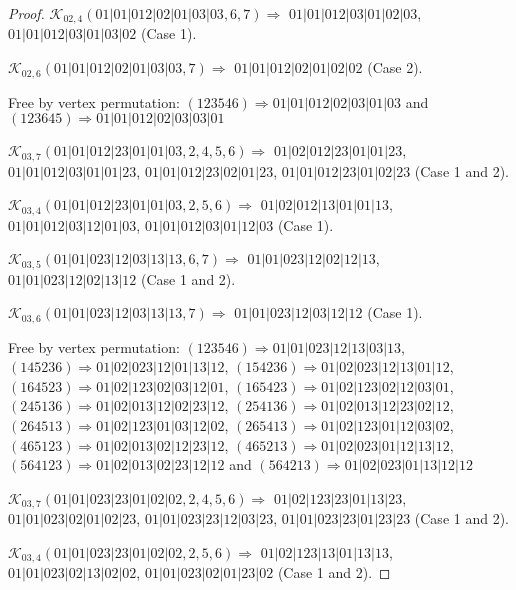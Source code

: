 \documentclass[12pt]{article}
\theoremstyle{plain}
\theoremstyle{definition}
\theoremstyle{remark}
\newcommand{\fancy}[1]{\mathcal{#1}}
\def\K{\fancy{K}}
\begin{document}
\begin{proof}
	$\K_{02,4}(01|01|012|02|01|03|03,6, 7)\Rightarrow $ $01|01|012|03|01|02|03$, $01|01|012|03|01|03|02$ (Case 1).
	
	$\K_{02,6}(01|01|012|02|01|03|03,7)\Rightarrow $ $01|01|012|02|01|02|02$ (Case 2).
	
	
	
	Free by vertex permutation: $(1 2 3 5 4 6)\Rightarrow 01|01|012|02|03|01|03$ and $(1 2 3 6 4 5)\Rightarrow 01|01|012|02|03|03|01$
	
	
	
	\bigskip
	
	$\K_{03,7}(01|01|012|23|01|01|03,2, 4, 5, 6)\Rightarrow $ $01|02|012|23|01|01|23$, $01|01|012|03|01|01|23$, $01|01|012|23|02|01|23$, $01|01|012|23|01|02|23$ (Case 1 and 2).
	
	$\K_{03,4}(01|01|012|23|01|01|03,2, 5, 6)\Rightarrow $ $01|02|012|13|01|01|13$, $01|01|012|03|12|01|03$, $01|01|012|03|01|12|03$ (Case 1).
	
	
	\bigskip
	
	$\K_{03,5}(01|01|023|12|03|13|13,6, 7)\Rightarrow $ $01|01|023|12|02|12|13$, $01|01|023|12|02|13|12$ (Case 1 and 2).
	
	$\K_{03,6}(01|01|023|12|03|13|13,7)\Rightarrow $ $01|01|023|12|03|12|12$ (Case 1).
	
	
	
	Free by vertex permutation: $(1 2 3 5 4 6)\Rightarrow 01|01|023|12|13|03|13$, $(1 4 5 2 3 6)\Rightarrow 01|02|023|12|01|13|12$, $(1 5 4 2 3 6)\Rightarrow 01|02|023|12|13|01|12$, $(1 6 4 5 2 3)\Rightarrow 01|02|123|02|03|12|01$, $(1 6 5 4 2 3)\Rightarrow 01|02|123|02|12|03|01$, $(2 4 5 1 3 6)\Rightarrow 01|02|013|12|02|23|12$, $(2 5 4 1 3 6)\Rightarrow 01|02|013|12|23|02|12$, $(2 6 4 5 1 3)\Rightarrow 01|02|123|01|03|12|02$, $(2 6 5 4 1 3)\Rightarrow 01|02|123|01|12|03|02$, $(4 6 5 1 2 3)\Rightarrow 01|02|013|02|12|23|12$, $(4 6 5 2 1 3)\Rightarrow 01|02|023|01|12|13|12$, $(5 6 4 1 2 3)\Rightarrow 01|02|013|02|23|12|12$ and $(5 6 4 2 1 3)\Rightarrow 01|02|023|01|13|12|12$
	
	
	
	\bigskip
	
	$\K_{03,7}(01|01|023|23|01|02|02,2, 4, 5, 6)\Rightarrow $ $01|02|123|23|01|13|23$, $01|01|023|02|01|02|23$, $01|01|023|23|12|03|23$, $01|01|023|23|01|23|23$ (Case 1 and 2).
	
	$\K_{03,4}(01|01|023|23|01|02|02,2, 5, 6)\Rightarrow $ $01|02|123|13|01|13|13$, $01|01|023|02|13|02|02$, $01|01|023|02|01|23|02$ (Case 1 and 2).
	
	
	

\end{proof}
\end{document}
